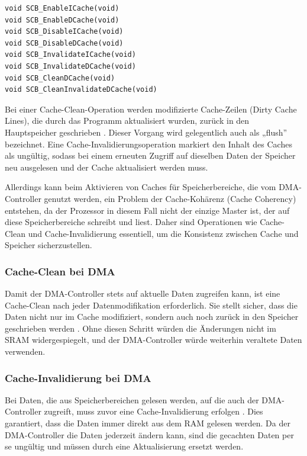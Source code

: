 \begin{code}
\begin{verbatim}
void SCB_EnableICache(void)
void SCB_EnableDCache(void)
void SCB_DisableICache(void)
void SCB_DisableDCache(void)
void SCB_InvalidateICache(void)
void SCB_InvalidateDCache(void)
void SCB_CleanDCache(void)
void SCB_CleanInvalidateDCache(void)
\end{verbatim}
\end{code}

Bei einer Cache-Clean-Operation werden modifizierte Cache-Zeilen (Dirty Cache
Lines), die durch das Programm aktualisiert wurden, zurück in den Hauptspeicher
geschrieben \cite[S. 4]{an4839}. Dieser Vorgang wird gelegentlich auch als
„flush” bezeichnet. Eine Cache-Invalidierungsoperation markiert den Inhalt des
Caches als ungültig, sodass bei einem erneuten Zugriff auf dieselben Daten der
Speicher neu ausgelesen und der Cache aktualisiert werden muss.

Allerdings kann beim Aktivieren von Caches für Speicherbereiche, die vom
DMA-Controller genutzt werden, ein Problem der Cache-Kohärenz (Cache Coherency)
entstehen, da der Prozessor in diesem Fall nicht der einzige Master ist, der auf
diese Speicherbereiche schreibt und liest. Daher sind Operationen wie
Cache-Clean und Cache-Invalidierung essentiell, um die Konsistenz zwischen Cache
und Speicher sicherzustellen.

\subsubsection{Cache-Clean bei DMA} \label{sec:cache_clean}

Damit der DMA-Controller stets auf aktuelle Daten zugreifen kann, ist eine
Cache-Clean nach jeder Datenmodifikation erforderlich. Sie stellt sicher, dass
die Daten nicht nur im Cache modifiziert, sondern auch noch zurück in den
Speicher geschrieben werden \cite[S. 6]{an4839}. Ohne diesen Schritt würden die
Änderungen nicht im SRAM widergespiegelt, und der DMA-Controller würde weiterhin
veraltete Daten verwenden.

\subsubsection{Cache-Invalidierung bei DMA}

Bei Daten, die aus Speicherbereichen gelesen werden, auf die auch der
DMA-Controller zugreift, muss zuvor eine Cache-Invalidierung erfolgen
\cite{embeddedexpert_cache}. Dies garantiert, dass die Daten immer direkt aus
dem RAM gelesen werden. Da der DMA-Controller die Daten jederzeit ändern kann,
sind die gecachten Daten per se ungültig und müssen durch eine Aktualisierung
ersetzt werden.

